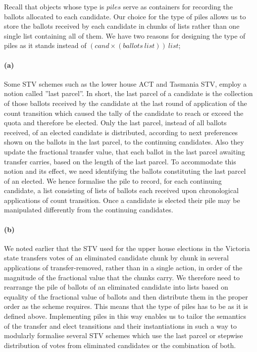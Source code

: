 \documentclass[10pt,conference]{IEEEtran}
\begin{document}
 Recall that objects whose type is $\mathit{piles}$ serve as
 containers for recording the ballots allocated to each candidate.
 Our choice for the  type of piles allows us to store the ballots received by each candidate in chunks of lists rather than one single list containing all of them.  We have two reasons for designing the type of piles as it stands instead of $\mathit{(cand\times(ballots~list))~list}$;  
\paragraph*{(a)} Some STV schemes such as the lower house ACT and
Tasmania STV, employ a notion called ''last parcel''. In short, the
last parcel of a candidate is the collection of those ballots
received by the candidate at the last round of application of the
count transition which caused the tally of the candidate to reach or
exceed the quota and therefore be elected.  Only the last parcel,
instead of all ballots received, of an elected candidate is distributed, according to next preferences shown on the ballots in the last parcel, to the continuing candidates.
 Also  they update the fractional transfer value, that each ballot in the last parcel  awaiting transfer carries, based on the length of the last parcel. To  accommodate this notion and its effect, we need identifying the ballots constituting the last parcel of an elected. We hence formalise the pile to record, for each  continuing candidate, a list consisting of lists of ballots each received upon  chronological applications of count transition.  Once a candidate is elected their pile may be manipulated differently from the continuing candidates. 
\paragraph*{(b)} We noted earlier that the STV used for the upper house elections in the Victoria state transfers votes of an eliminated candidate chunk by chunk in several applications of transfer-removed, rather than in a single action, in order of the magnitude of the fractional value that the chunks carry. We therefore need to rearrange the pile of ballots of an eliminated candidate into lists based on equality of the fractional value of ballots and then distribute them in the proper order as the scheme requires. This means that the type of piles has to be as it is defined above.   
Implementing piles in this way enables us to tailor the semantics of the transfer and elect transitions and their instantiations in such a way to modularly formalise several STV schemes which use the last parcel or stepwise distribution of votes from eliminated candidates or the combination of both. 
\end{document}
